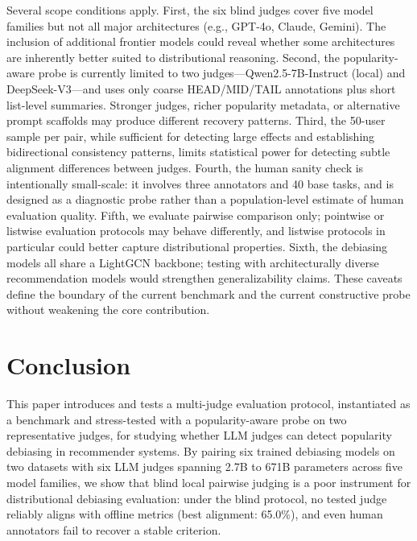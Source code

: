 \documentclass[pdflatex,sn-basic,referee,lineno]{sn-jnl}
\begin{document}
Several scope conditions apply. First, the six blind judges cover five model families but not all major architectures (e.g., GPT-4o, Claude, Gemini). The inclusion of additional frontier models could reveal whether some architectures are inherently better suited to distributional reasoning. Second, the popularity-aware probe is currently limited to two judges---Qwen2.5-7B-Instruct (local) and DeepSeek-V3---and uses only coarse HEAD/MID/TAIL annotations plus short list-level summaries. Stronger judges, richer popularity metadata, or alternative prompt scaffolds may produce different recovery patterns. Third, the 50-user sample per pair, while sufficient for detecting large effects and establishing bidirectional consistency patterns, limits statistical power for detecting subtle alignment differences between judges. Fourth, the human sanity check is intentionally small-scale: it involves three annotators and 40 base tasks, and is designed as a diagnostic probe rather than a population-level estimate of human evaluation quality. Fifth, we evaluate pairwise comparison only; pointwise or listwise evaluation protocols may behave differently, and listwise protocols in particular could better capture distributional properties. Sixth, the debiasing models all share a LightGCN backbone; testing with architecturally diverse recommendation models would strengthen generalizability claims. These caveats define the boundary of the current benchmark and the current constructive probe without weakening the core contribution.

\section{Conclusion}
\label{sec:conclusion}

This paper introduces and tests a multi-judge evaluation protocol, instantiated as a benchmark and stress-tested with a popularity-aware probe on two representative judges, for studying whether LLM judges can detect popularity debiasing in recommender systems. By pairing six trained debiasing models on two datasets with six LLM judges spanning 2.7B to 671B parameters across five model families, we show that blind local pairwise judging is a poor instrument for distributional debiasing evaluation: under the blind protocol, no tested judge reliably aligns with offline metrics (best alignment: 65.0\%), and even human annotators fail to recover a stable criterion.
\end{document}
